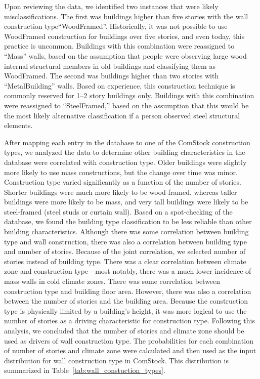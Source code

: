 %

Upon reviewing the data, we identified two instances that were likely misclassifications. The first was buildings higher than five stories with the wall construction type``WoodFramed''. Historically, it was not possible to use WoodFramed construction for buildings over five stories, and even today, this practice is uncommon. Buildings with this combination were reassigned to ``Mass'' walls, based on the assumption that people were observing large wood internal structural members in old buildings and classifying them as WoodFramed. The second was buildings higher than two stories with ``MetalBuilding'' walls. Based on experience, this construction technique is commonly reserved for 1--2 story buildings only. Buildings with this combination were reassigned to ``SteelFramed,'' based on the assumption that this would be the most likely alternative classification if a person observed steel structural elements.

After mapping each entry in the database to one of the ComStock construction types, we analyzed the data to determine other building characteristics in the database were correlated with construction type. Older buildings were slightly more likely to use mass constructions, but the change over time was minor. Construction type varied significantly as a function of the number of stories. Shorter buildings were much more likely to be wood-framed, whereas taller buildings were more likely to be mass, and very tall buildings were likely to be steel-framed (steel studs or curtain wall). Based on a spot-checking of the database, we found the building type classification to be less reliable than other building characteristics. Although there was some correlation between building type and wall construction, there was also a correlation between building type and number of stories. Because of the joint correlation, we selected number of stories instead of building type. There was a clear correlation between climate zone and construction type---most notably, there was a much lower incidence of mass walls in cold climate zones. There was some correlation between construction type and building floor area. However, there was also a correlation between the number of stories and the building area. Because the construction type is physically limited by a building's height, it was more logical to use the number of stories as a driving characteristic for construction type. Following this analysis, we concluded that the number of stories and climate zone should be used as drivers of wall construction type. The probabilities for each combination of number of stories and climate zone were calculated  and then used as the input distribution for wall construction type in ComStock. This distribution is summarized in Table~\ref{tab:wall_constuction_types}.

